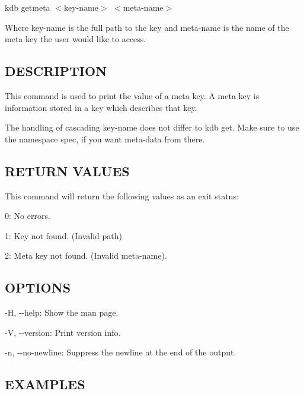 {\ttfamily kdb getmeta $<$key-\/name$>$ $<$meta-\/name$>$}

Where {\ttfamily key-\/name} is the full path to the key and {\ttfamily meta-\/name} is the name of the meta key the user would like to access.

\subsection*{D\+E\+S\+C\+R\+I\+P\+T\+I\+O\+N}

This command is used to print the value of a meta key. A meta key is information stored in a key which describes that key.

The handling of cascading {\ttfamily key-\/name} does not differ to {\ttfamily kdb get}. Make sure to use the namespace {\ttfamily spec}, if you want meta-\/data from there.

\subsection*{R\+E\+T\+U\+R\+N V\+A\+L\+U\+E\+S}

This command will return the following values as an exit status\+:
\begin{DoxyItemize}
\item 0\+: No errors.
\item 1\+: Key not found. (Invalid {\ttfamily path})
\item 2\+: Meta key not found. (Invalid {\ttfamily meta-\/name}).
\end{DoxyItemize}

\subsection*{O\+P\+T\+I\+O\+N\+S}


\begin{DoxyItemize}
\item {\ttfamily -\/\+H}, {\ttfamily -\/-\/help}\+: Show the man page.
\item {\ttfamily -\/\+V}, {\ttfamily -\/-\/version}\+: Print version info.
\item {\ttfamily -\/n}, {\ttfamily -\/-\/no-\/newline}\+: Suppress the newline at the end of the output.
\end{DoxyItemize}

\subsection*{E\+X\+A\+M\+P\+L\+E\+S}

